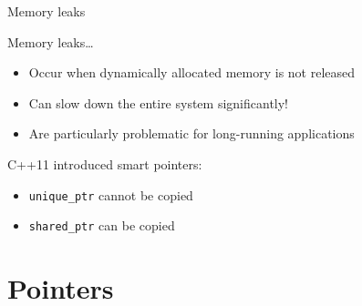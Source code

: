 \begin{frame}[fragile]{Memory leaks}
    \begin{block}{Memory leaks\ldots}
        \begin{itemize}
            \item Occur when dynamically allocated memory is not released
            \item Can slow down the entire system significantly!
            \item Are particularly problematic for long\hyp{}running
                  applications
        \end{itemize}
    \end{block}
    \begin{block}{C++11 introduced \alert{smart pointers}:}
        \begin{itemize}
            \item \texttt{unique_ptr} cannot be copied
            \item \texttt{shared_ptr} can be copied
        \end{itemize}
    \end{block}
\end{frame}

\section{Pointers}



